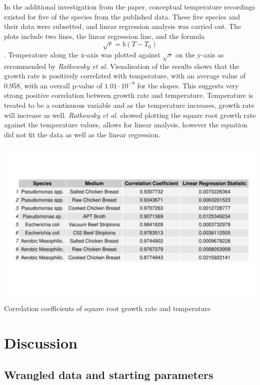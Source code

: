 \documentclass[11pt]{article}
\begin{document}
In the additional investigation from the paper, conceptual temperature recordings existed for five of the species from the published data. These five species and their data were subsetted, and linear regression analysis was carried out. The plots include two lines, the linear regression line, and the formula \begin{equation*}\sqrt{r}=b(T-T_0)\end{equation*}\cite{ratkowsky1982relationship}. Temperature along the x-axis was plotted against $\sqrt{r}$ on the y-axis as recommended by \textit{Ratkowsky et al.} Visualisation of the results shows that the growth rate is positively correlated with temperature, with an average value of 0.958, with an overall p-value of $1.01\cdot10^{-9}$ for the slopes. This suggests very strong positive correlation between growth rate and temperature. Temperature is treated to be a continuous variable and as the temperature increases, growth rate will increase as well. \textit{Ratkowsky et al.} showed plotting the square root growth rate against the temperature values, allows for linear analysis, however the equation did not fit the data as well as the linear regression.
\begin{table}[h!]
\centering
\includegraphics[scale=0.40]{../Results/Temperature_Growthrate.pdf} \caption{Correlation coefficients of square root growth rate and temperature} \label{tab:Correlation Table}
\end{table}

\section{Discussion}
\subsection{Wrangled data and starting parameters}
\end{document}

